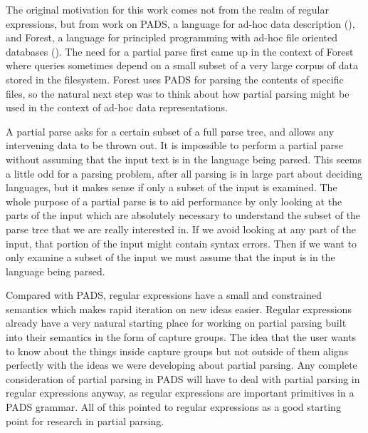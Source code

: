 The original motivation for this work comes not from the realm of
regular expressions, but from work on PADS, a language for ad-hoc
data description (\cite{Fisher2005}), and Forest, a language for
principled programming with ad-hoc file oriented databases
(\cite{Fisher2011}). The need for a partial parse first
came up in the context of Forest where queries sometimes depend on
a small subset of a very large corpus of data stored in the filesystem.
Forest uses PADS for parsing the contents of specific files, so the
natural next step was to think about how partial parsing might
be used in the context of ad-hoc data representations.

A partial parse asks for a certain subset of a full parse tree,
and allows any intervening data to be thrown out. It is impossible
to perform a partial parse without assuming that the input text
is in the language being parsed. This seems a little odd for a
parsing problem, after all parsing is in large part about deciding
languages, but it makes sense if only a subset of the input is
examined. The whole purpose of a partial parse
is to aid performance by only looking at the parts of the input which
are absolutely necessary to understand the subset of the parse tree
that we are really interested in. If we avoid looking at any part of
the input, that portion of the input might contain syntax errors.
Then if we want to only examine a subset of the input we must assume
that the input is in the language being parsed.

Compared with PADS, regular expressions have a small and
constrained semantics which makes rapid iteration on new
ideas easier. Regular expressions already have a very natural
starting place for working on partial parsing built into their
semantics in the form of capture groups. The idea that the user wants
to know about the things inside capture groups but not outside of
them aligns perfectly with the ideas we were developing about
partial parsing. Any complete consideration of partial
parsing in PADS will have to deal with partial parsing in regular
expressions anyway, as regular expressions are important primitives in
a PADS grammar. All of this pointed to regular expressions as a good
starting point for research in partial parsing.

